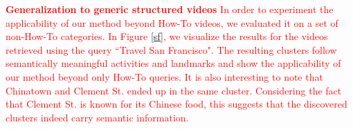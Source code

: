 \vspace{1mm}
\noindent\textbf{\textcolor{red}{Generalization to generic structured videos}}
\textcolor{red}{In order to experiment the applicability of our method beyond How-To videos, we evaluated it on a set of non-How-To categories. In Figure \ref{sf}, we visualize the results for the videos retrieved using the query ``Travel San Francisco". The resulting clusters follow semantically meaningful activities and landmarks and show the applicability of our method beyond only How-To queries. It is also interesting to note that Chinatown and Clement St. ended up in the same cluster. Considering the fact that Clement St. is known for its Chinese food, this suggests that the discovered clusters indeed carry semantic information.}
\vspace{-2mm}
